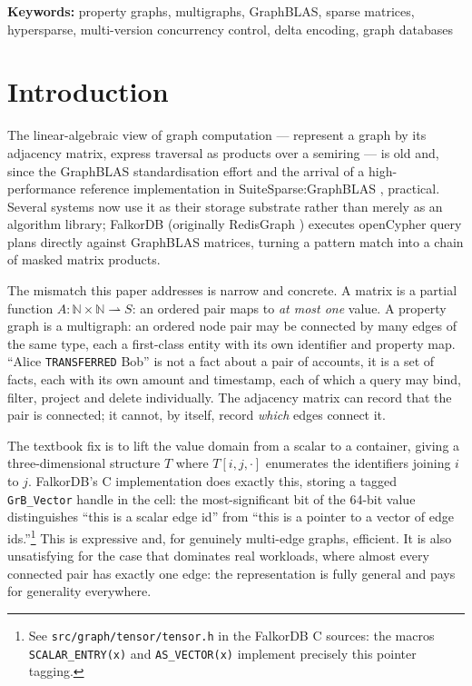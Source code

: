 \documentclass[11pt,a4paper]{article}
\theoremstyle{plain}
\theoremstyle{definition}
\theoremstyle{remark}
\begin{document}
\noindent\textbf{Keywords:} property graphs, multigraphs, GraphBLAS, sparse
matrices, hypersparse, multi-version concurrency control, delta encoding,
graph databases

\section{Introduction}
\label{sec:intro}

The linear-algebraic view of graph computation --- represent a graph by its
adjacency matrix, express traversal as products over a semiring --- is old
\cite{kepnergilbert2011} and, since the GraphBLAS standardisation effort
\cite{mattson2013,kepner2016,brock2021spec} and the arrival of a
high-performance reference implementation in SuiteSparse:GraphBLAS
\cite{davis2019toms,davis2023toms}, practical. Several systems now use it as
their storage substrate rather than merely as an algorithm library; FalkorDB
(originally RedisGraph \cite{cailliau2019}) executes openCypher
\cite{francis2018cypher} query plans directly against GraphBLAS matrices,
turning a pattern match into a chain of masked matrix products.

The mismatch this paper addresses is narrow and concrete. A matrix is a
partial function $A : \mathbb{N} \times \mathbb{N} \rightharpoonup S$: an
ordered pair maps to \emph{at most one} value. A property graph
\cite{angles2017foundations} is a multigraph: an ordered node pair may be
connected by many edges of the same type, each a first-class entity with its
own identifier and property map. ``Alice \texttt{TRANSFERRED} Bob'' is not a
fact about a pair of accounts, it is a set of facts, each with its own amount
and timestamp, each of which a query may bind, filter, project and delete
individually. The adjacency matrix can record that the pair is connected; it
cannot, by itself, record \emph{which} edges connect it.

The textbook fix is to lift the value domain from a scalar to a container,
giving a three-dimensional structure $T$ where $T[i,j,\cdot]$ enumerates the
identifiers joining $i$ to $j$. FalkorDB's C implementation does exactly
this, storing a tagged \texttt{GrB\_Vector} handle in the cell: the
most-significant bit of the 64-bit value distinguishes ``this is a scalar
edge id'' from ``this is a pointer to a vector of edge ids.''\footnote{See
\texttt{src/graph/tensor/tensor.h} in the FalkorDB C sources: the macros
\texttt{SCALAR\_ENTRY(x)} and \texttt{AS\_VECTOR(x)} implement precisely this
pointer tagging.} This is expressive and, for genuinely multi-edge graphs,
efficient. It is also unsatisfying for the case that dominates real
workloads, where almost every connected pair has exactly one edge: the
representation is fully general and pays for generality everywhere.
\end{document}
